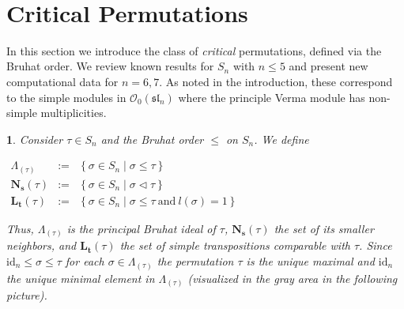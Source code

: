 \documentclass[a4 paper,12pt]{article}
\newcommand{\ger}[1]{\mathfrak{#1}}
\newcommand{\sma}{\triangleleft}
\newcommand{\OO}{\mathcal{O}}
\newcommand{\ma}{\leqslant}
\DeclareMathOperator{\Inv}{Inv}
\DeclareMathOperator{\Bruh}{\leqslant}
\newtheorem{numeris}{}[section]
\begin{document}
\\[4.5cm]









\section{\textbf{Critical Permutations}}
\begin{small}
In this section we introduce the class of \emph{critical} permutations, defined via the Bruhat order. We review known results for $S_n$ with $n \leq 5$ and present new computational data for $n=6,7$.  As noted in the introduction, these correspond to the simple modules in $\OO_{0}(\ger{sl}_{n}) $ where the principle Verma module has non-simple multiplicities.  
\end{small}





\begin{numeris} Consider  $\tau \in S_{n}$ and the Bruhat order $\Bruh$ on $S_n$. We define
	\begin{center}
	$
		\begin{array}{ccl}
	\Lambda_{(\tau)} &:= & \left\{\sigma \in S_n  \mid  \sigma \Bruh \tau \right\}\\[2mm]
	\textbf{N}_{\textbf{s}}(\tau) &:=& \left\{\sigma \in S_{n} \mid \sigma \sma \tau \right\} %
	\\[3mm]
	\textbf{L}_{\textbf{t}}(\tau)&:=& \left\{\sigma \in S_{n} \mid \sigma \Bruh \tau \  \textrm{and} \ l(\sigma)=1 \right\} %
	\end{array}$
\end{center}
Thus, $\Lambda_{(\tau)}$ is the principal Bruhat ideal of $\tau$, $\mathbf{N}_{\mathbf{s}}(\tau)$ the set of its smaller neighbors, and $\mathbf{L}_{\mathbf{t}}(\tau)$ the set of simple transpositions comparable with $\tau$.
Since  $\textrm{id}_n\ma \sigma \ma \tau$ for each $\sigma \in \Lambda_{(\tau)}$ the permutation 
 $\tau$ is the unique maximal and $\textrm{id}_n$ the unique  minimal element in $\Lambda_{(\tau)}$ (visualized in the gray area in the following picture). 
\label{principal_set}
\end{numeris}
\end{document}
